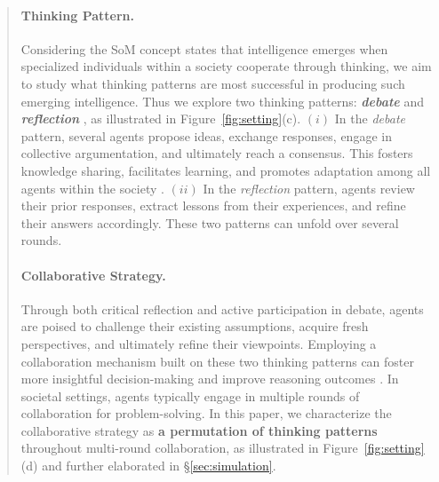 \documentclass[11pt]{article}
\begin{document}
\begin{abstract}
\paragraph{Thinking Pattern.} 
 Considering the SoM concept \citep{Book1988_SoM} states that intelligence emerges when specialized individuals within a society cooperate through thinking, we aim to study what thinking patterns are most successful in producing such emerging intelligence. Thus we explore two thinking patterns: \textbf{\textit{debate}} \citep{Book2005_Society-Dissent,arXiv2023_MultiAgent-Debate,arXiv2023_MultiAgent-Debate_2} and \textbf{\textit{reflection}} \citep{J1985_Reflection,Book2010_Reflection,arXiv2023_Reflexion}, as illustrated in Figure~\ref{fig:setting}(c). 
$(i)$ In the \emph{debate} pattern, several agents propose ideas, exchange responses, engage in collective argumentation, and ultimately reach a consensus. This fosters knowledge sharing, facilitates learning, and promotes adaptation among all agents within the society \citep{1995_MultiAgent-System,J2000_MultiAgent-System,Book2006_MultiAgent-System,Book2009_MultiAgent-System}. 
$(ii)$ In the \emph{reflection} pattern, agents review their prior responses, extract lessons from their experiences, and refine their answers accordingly. 
These two patterns can unfold over several rounds. 

\paragraph{Collaborative Strategy.}
\label{sec:interaction_strategy}
Through both critical reflection and active participation in debate, agents are poised to challenge their existing assumptions, acquire fresh perspectives, and ultimately refine their viewpoints. Employing a collaboration mechanism built on these two thinking patterns can foster more insightful decision-making \citep{Book2009_MultiAgent-System,J2009_DecisionMaking} and improve reasoning outcomes \citep{2018_Theory}.
In societal settings, agents typically engage in multiple rounds of collaboration for problem-solving. 
In this paper, we characterize the collaborative strategy as \textbf{a permutation of thinking patterns} throughout multi-round collaboration, as illustrated in Figure~\ref{fig:setting}(d) and further elaborated in \S\ref{sec:simulation}. 




\end{abstract}
\end{document}
